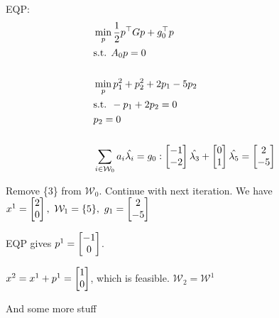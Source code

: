 \documentclass{article}
\begin{document}
\medskip EQP:
\begin{align*}
  &\min_p \frac{1}{2}p^{\top}Gp + g_0^{\top}p  \\ 
  &\text{s.t. } A_0 p = 0 \\  \\ 
  &\min_p p_1^2+p_2^2+2p_1-5p_2 \\ 
  &\text{s.t. }-p_1+2p_2 = 0 \\ 
  &p_2 = 0  \\  \\ 
  & \sum_{i\in \mathcal{W}_0}a_i \hat{\lambda_i} = g_0 : \begin{bmatrix} -1 \\ -2 \end{bmatrix} \hat{\lambda_3} + \begin{bmatrix} 0 \\ 1 \end{bmatrix} \hat{\lambda_5} = \begin{bmatrix} 2 \\ -5 \end{bmatrix}
\end{align*}

Remove \{3\} from $\mathcal{W}_0$. Continue with next iteration.
We have $x^{1} = \begin{bmatrix} 2 \\ 0 \end{bmatrix},\ \mathcal{W}_1 = \{5\},\ g_1 = \begin{bmatrix} 2 \\ -5 \end{bmatrix}$

EQP gives $p^{1} = \begin{bmatrix} -1 \\ 0 \end{bmatrix}$. 

\medskip $x^2 = x^{1}+ p ^{1} = \begin{bmatrix} 1 \\ 0 \end{bmatrix}$, which is feasible. $\mathcal{W}_2 = \mathcal{W}^{1}$

And some more stuff
\end{document}
